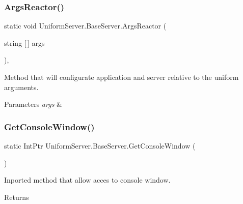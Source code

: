 \subsubsection{\texorpdfstring{Args\+Reactor()}{ArgsReactor()}}
{\footnotesize\ttfamily static void Uniform\+Server.\+Base\+Server.\+Args\+Reactor (\begin{DoxyParamCaption}\item[{string \mbox{[}$\,$\mbox{]}}]{args }\end{DoxyParamCaption})\hspace{0.3cm}{\ttfamily [static]}, {\ttfamily [protected]}}



Method that will configurate application and server relative to the uniform arguments. 


\begin{DoxyParams}{Parameters}
{\em args} & \\
\hline
\end{DoxyParams}
\mbox{\label{class_uniform_server_1_1_base_server_a1b7d5587de4974fad2ec366a571791e0}} 
\subsubsection{\texorpdfstring{Get\+Console\+Window()}{GetConsoleWindow()}}
{\footnotesize\ttfamily static Int\+Ptr Uniform\+Server.\+Base\+Server.\+Get\+Console\+Window (\begin{DoxyParamCaption}{ }\end{DoxyParamCaption})\hspace{0.3cm}{\ttfamily [protected]}}



Inported method that allow acces to console window. 

\begin{DoxyReturn}{Returns}

\end{DoxyReturn}
\mbox{\label{class_uniform_server_1_1_base_server_a22b92ad517cd1003fe4fe3c86d857169}} 
